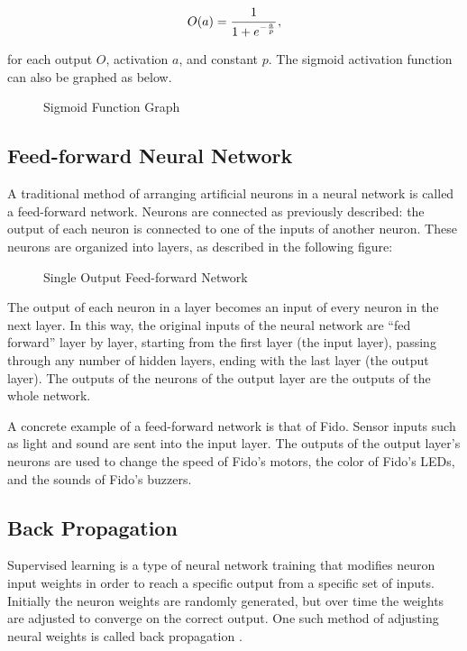 \begin{equation}
	O(a) = \cfrac{1}{1+e^{-\frac{a}{p}}}
	\,,
\end{equation}

\noindent for each output $O$, activation $a$, and constant $p$. The sigmoid activation function can also be graphed as below.

\begin{figure}[ht]
	\centering
	
	\caption{Sigmoid Function Graph}
\end{figure}

\subsection{Feed-forward Neural Network}

A traditional method of arranging artificial neurons in a neural network is called a feed-forward network. Neurons are connected as previously described: the output of each neuron is connected to one of the inputs of another neuron. These neurons are organized into layers, as described in the following figure:

\begin{figure}[ht]
	\centering
	
	\caption{Single Output Feed-forward Network}
\end{figure}

The output of each neuron in a layer becomes an input of every neuron in the next layer. In this way, the original inputs of the neural network are ``fed forward'' layer by layer, starting from the first layer (the input layer), passing through any number of hidden layers, ending with the last layer (the output layer). The outputs of the neurons of the output layer are the outputs of the whole network.

A concrete example of a feed-forward network is that of Fido. Sensor inputs such as light and sound are sent into the input layer. The outputs of the output layer's neurons are used to change the speed of Fido's motors, the color of Fido's LEDs, and the sounds of Fido's buzzers.

\subsection{Back Propagation}

Supervised learning is a type of neural network training that modifies neuron input weights in order to reach a specific output from a specific set of inputs.  Initially the neuron weights are randomly generated, but over time the weights are adjusted to converge on the correct output.  One such method of adjusting neural weights is called back propagation \cite{werbos}.


